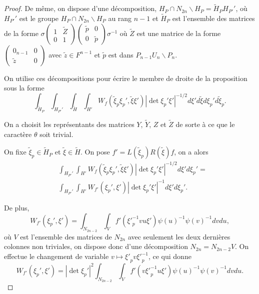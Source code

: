\documentclass{amsart}
\begin{document}
\begin{proof}
De même, on dispose d'une décomposition, $H_P \cap N_{2n} \backslash{H_P} = \tilde{H}_P H_{P'}'$, où $H_{P'}'$ est le groupe $H_P \cap N_{2n} \backslash{H_P}$ au rang $n-1$ et $\tilde{H}_P$ est l'ensemble des matrices de la forme $\sigma \begin{pmatrix}
1 & \tilde{Z} \\
0 & 1
\end{pmatrix}\begin{pmatrix}
\tilde{p} & 0 \\
0 & \tilde{p}
\end{pmatrix} \sigma^{-1}$ où $\tilde{Z}$ est une matrice de la forme $\begin{pmatrix}
0_{n-1} & 0 \\
\tilde{z} & 0
\end{pmatrix}$ avec $\tilde{z} \in F^{n-1}$ et $\tilde{p}$ est dans $P_{n-1}U_n \backslash{P_n}$. 

On utilise ces décompositions pour écrire le membre de droite de la proposition sous la forme
\begin{equation}
\int_{\tilde{H}_P} \int_{H_{P'}'} \int_{\tilde{H}} \int_{H'} W_f(\tilde{\xi}_p\xi_p', \tilde{\xi}\xi') |\det \xi_p'\xi'|^{-1/2} d\xi' d\tilde{\xi} d\xi_p' d\tilde{\xi}_p.
\end{equation}

On a choisit les représentants des matrices $Y$, $\tilde{Y}$, $Z$ et $\tilde{Z}$ de sorte à ce que le caractère $\theta$ soit trivial.

On fixe $\tilde{\xi}_p \in \tilde{H}_P$ et $\tilde{\xi} \in \tilde{H}$. On pose $f' = L(\tilde{\xi}_p)R(\tilde{\xi})f$, on a alors
 \begin{equation}
 \begin{split}
 & \int_{H_{P'}'} \int_{H'} W_f(\tilde{\xi}_p\xi_p', \tilde{\xi}\xi') |\det \xi_p'\xi'|^{-1/2} d\xi' d\xi_p'= \\
 & \int_{H_{P'}'} \int_{H'} W_{f'}(\xi_p', \xi') |\det \xi_p'\xi'|^{-1} d\xi' d\xi_p'.
 \end{split}
 \end{equation}

De plus,
 \begin{equation}
 W_{f'}(\xi_p', \xi') = \int_{N_{2n-2}} \int_V f'({\xi'}_p^{-1} v u \xi') \psi(u)^{-1}\psi(v)^{-1} dv du,
 \end{equation}
 où $V$ est l'ensemble des matrices de $N_{2n}$ avec seulement les deux dernières colonnes non triviales, on dispose donc d'une décomposition $N_{2n} = N_{2n-2}V$. On effectue le changement de variable $v \mapsto {\xi'}_p v {\xi'}_p^{-1}$, ce qui donne
 \begin{equation}
 W_{f'}(\xi_p', \xi') = |\det \xi_p'|^{2}\int_{N_{2n-2}} \int_V f'(v {\xi'}_p^{-1} u \xi') \psi(u)^{-1}\psi(v)^{-1} dv du.
 \end{equation}


\end{proof}
\end{document}
